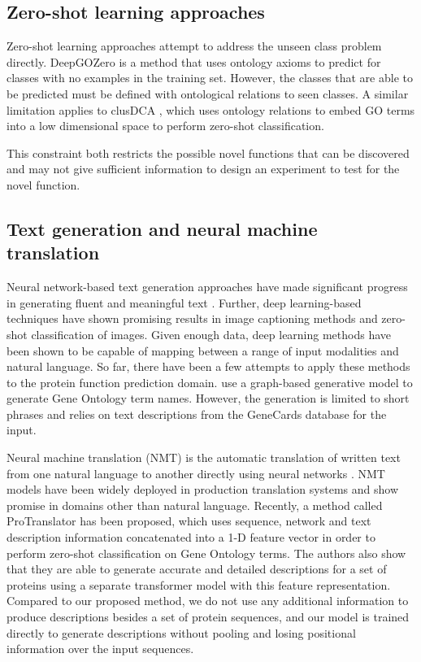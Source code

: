 \documentclass{article}
\begin{document}
	\subsection{Zero-shot learning approaches}
    Zero-shot learning approaches attempt to address the unseen class problem directly.
    DeepGOZero \citep{DeepGOZero} is a method that uses ontology axioms to predict for classes with no examples in the training set.
    However, the classes that are able to be predicted must be defined with ontological relations to seen classes. 
	A similar limitation applies to clusDCA \citep{clusDCA}, which uses ontology relations to embed GO terms into a low dimensional space to perform zero-shot classification.

    This constraint both restricts the possible novel functions that can be discovered and may not give sufficient information to design an experiment to test for the novel function.

    \subsection{Text generation and neural machine translation}
    Neural network-based text generation approaches have made significant progress in generating fluent and meaningful text \citep{fatima2022systematic}. 
    Further, deep learning-based techniques have shown promising results in image captioning methods \citep{hossain2019comprehensive} and zero-shot classification of images\cite{CLIP}.
    Given enough data, deep learning methods have been shown to be capable of mapping between a range of input modalities and natural language.
    So far, there have been a few attempts to apply these methods to the protein function prediction domain.
    \cite{zhang2020automatic} use a graph-based generative model to generate Gene Ontology term names. However, the generation is limited to short phrases and relies on text descriptions from the GeneCards database \cite{GeneCards} for the input.

    Neural machine translation (NMT) is the automatic translation of written text from one natural language to another directly using neural networks \cite{cho2014properties}. NMT models have been widely deployed in production translation systems and show promise in domains other than natural language.
    Recently, a method called ProTranslator \citep{ProTranslator} has been proposed, which uses sequence, network and text description information concatenated into a 1-D feature vector in order to perform zero-shot classification on Gene Ontology terms.
    The authors also show that they are able to generate accurate and detailed descriptions for a set of proteins using a separate transformer model with this feature representation.
    Compared to our proposed method, we do not use any additional information to produce descriptions besides a set of protein sequences, and our model is trained directly to generate descriptions without pooling and losing positional information over the input sequences.
\end{document}
